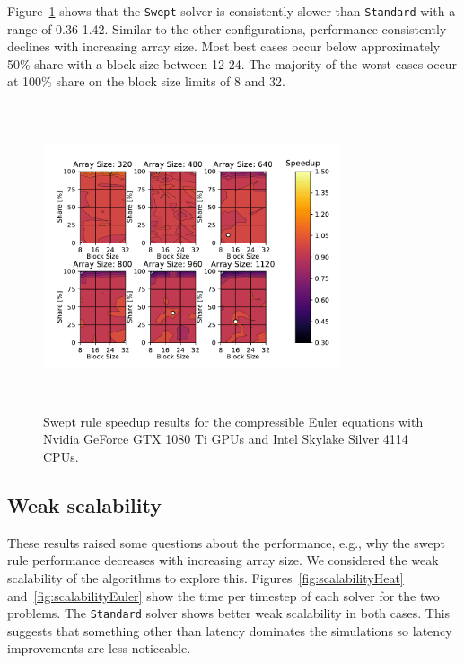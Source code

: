 \documentclass[preprints,article,accept,moreauthors,pdftex]{Definitions/mdpi}
\def\Swept{\texttt{Swept}}
\def\Standard{\texttt{Standard}}
\def\oldCPU{Intel Skylake Silver 4114} %
\def\oldGPU{Nvidia GeForce GTX 1080 Ti}
\begin{document}
Figure~\ref{fig:oldSpeedupEuler} shows that the \Swept{} solver is consistently slower than \Standard{} with a range of 0.36-1.42. Similar to the other configurations, performance consistently declines with increasing array size. Most best cases occur below approximately 50\% share with a block size between 12-24. The majority of the worst cases occur at 100\% share on the block size limits of 8 and 32.


\begin{figure}[htbp]
    \centering
    \includegraphics[height=9cm,width=0.78\textwidth, trim={0.75cm 0.4cm 0.8cm 0.7cm},clip]{figs/speedUpeulerOld.pdf}
    \caption{Swept rule speedup results  for the compressible Euler equations with \oldGPU{} GPUs and \oldCPU{} CPUs.}
    \label{fig:oldSpeedupEuler}
\end{figure}


\subsection{Weak scalability}

These results raised some questions about the performance, e.g., why the swept rule performance decreases with increasing array size. We considered the weak scalability of the algorithms to explore this. Figures~\ref{fig:scalabilityHeat} and~\ref{fig:scalabilityEuler} show the time per timestep of each solver for the two problems. 
The \Standard{} solver shows better weak scalability in both cases. This suggests that something other than latency dominates the simulations so latency improvements are less noticeable.
\end{document}

